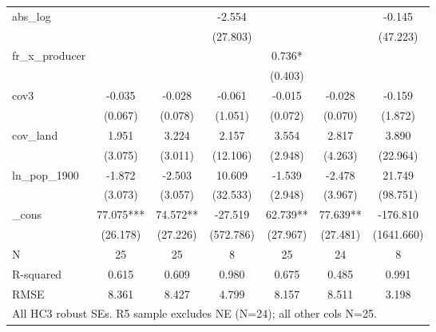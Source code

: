 \begin{table}[htbp]
\begin{tabular}{l*{6}{c}}
abs\_log     &               &               &      -2.554   &               &               &      -0.145   \\
            &               &               &    (27.803)   &               &               &    (47.223)   \\
fr\_x\_producer&               &               &               &       0.736*  &               &               \\
            &               &               &               &     (0.403)   &               &               \\
cov3        &      -0.035   &      -0.028   &      -0.061   &      -0.015   &      -0.028   &      -0.159   \\
            &     (0.067)   &     (0.078)   &     (1.051)   &     (0.072)   &     (0.070)   &     (1.872)   \\
cov\_land    &       1.951   &       3.224   &       2.157   &       3.554   &       2.817   &       3.890   \\
            &     (3.075)   &     (3.011)   &    (12.106)   &     (2.948)   &     (4.263)   &    (22.964)   \\
ln\_pop\_1900 &      -1.872   &      -2.503   &      10.609   &      -1.539   &      -2.478   &      21.749   \\
            &     (3.073)   &     (3.057)   &    (32.533)   &     (2.948)   &     (3.967)   &    (98.751)   \\
\_cons      &      77.075***&      74.572** &     -27.519   &      62.739** &      77.639** &    -176.810   \\
            &    (26.178)   &    (27.226)   &   (572.786)   &    (27.967)   &    (27.481)   &  (1641.660)   \\
\midrule
N           &          25   &          25   &           8   &          25   &          24   &           8   \\
R-squared   &       0.615   &       0.609   &       0.980   &       0.675   &       0.485   &       0.991   \\
RMSE        &       8.361   &       8.427   &       4.799   &       8.157   &       8.511   &       3.198   \\
\bottomrule
\multicolumn{7}{l}{\footnotesize All HC3 robust SEs.  R5 sample excludes NE (N=24); all other cols N=25.}\\
\end{tabular}
\end{table}
